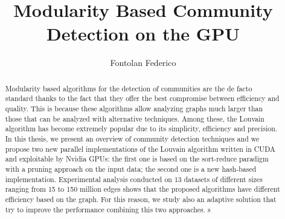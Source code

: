 \documentclass[12pt,a4paper,titlepage]{article}
\title{Modularity Based Community Detection on the GPU}
\author{Fontolan Federico}
\begin{document}
	
	
	\begin{abstract}
		Modularity based algorithms for the detection of communities are the de facto standard thanks to the fact that they offer the best compromise between efficiency and quality. 
		This is because these algorithms allow analyzing graphs much larger than those that can be analyzed with alternative techniques. Among these, the Louvain algorithm has become extremely popular due to its simplicity, efficiency and precision.
		In this thesis, we present an overview of community detection techniques and we propose two new parallel implementations of the Louvain algorithm written in CUDA and exploitable by Nvidia GPUs: the first one is based on the sort-reduce paradigm with a pruning approach on the input data; the second one is a new hash-based implementation. Experimental analysis conducted on 13 datasets of different sizes ranging from 15 to 150 million edges shows that the proposed algorithms have different efficiency based on the graph. For this reason, we study also an adaptive solution that try to improve the performance combining this two approaches. s
	\end{abstract}

	\tableofcontents
	\newpage
	
	\newpage
	
	\newpage
	
	\newpage
	
	\newpage
	
	\newpage
	
	\newpage
	
	\newpage
	\printbibliography
\end{document}
